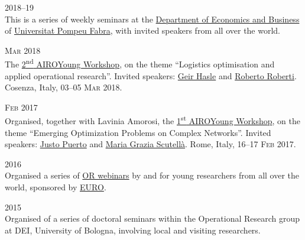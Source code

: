 \begin{paracol}{2}
  \textsc{2018--19}
\switchcolumn
  \\
  This is a series of weekly seminars at the \href{https://www.upf.edu/web/econ/}{Department of Economics and Business} of \href{https://www.upf.edu/}{Universitat Pompeu Fabra}, with invited speakers from all over the world.
\end{paracol}

\begin{paracol}{2}
  \textsc{Mar 2018}
\switchcolumn
  \\
  The \href{https://workshop.airoyoung.org/2018}{2\textsuperscript{nd} AIROYoung Workshop}, on the theme ``Logistics optimisation and applied operational research''.
  Invited speakers: \href{https://scholar.google.it/citations?user=GXRnRZgAAAAJ}{Geir Hasle} and \href{https://scholar.google.it/citations?user=pNQZmwIAAAAJ}{Roberto Roberti}.
  Cosenza, Italy, \textsc{03--05 Mar 2018}.
\end{paracol}

\begin{paracol}{2}
  \textsc{Feb 2017}
\switchcolumn
  \\
    Organised, together with Lavinia Amorosi, the \href{https://workshop.airoyoung.org/2017}{1\textsuperscript{st} AIROYoung Workshop}, on the theme ``Emerging Optimization Problems on Complex Networks''.
    Invited speakers: \href{https://scholar.google.com/citations?user=koF66usAAAAJ}{Justo Puerto} and \href{https://scholar.google.com/citations?user=PcGjfV8AAAAJ}{Maria Grazia Scutellà}.
    Rome, Italy, \textsc{16--17 Feb 2017}.
\end{paracol}

\begin{paracol}{2}
  \textsc{2016}
\switchcolumn
  \\
  Organised a series of \href{https://www.airoyoung.org/resources/euro-seminars}{OR webinars} by and for young researchers from all over the world, sponsored by \href{https://www.euro-online.org}{EURO}.
\end{paracol}

\begin{paracol}{2}
  \textsc{2015}
\switchcolumn
  \\
  Organised of a series of doctoral seminars within the Operational Research group at DEI, University of Bologna, involving local and visiting researchers.
\end{paracol}